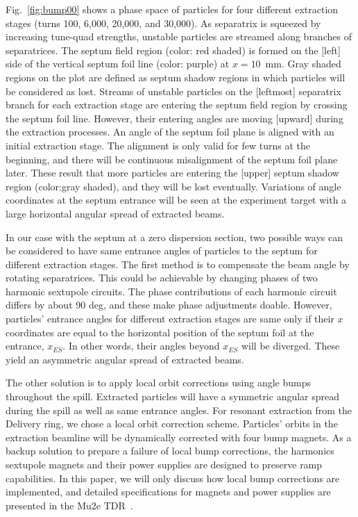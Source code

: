 \documentclass[aps,prstab,onecolumn,preprint,endfloats,11pt]{revtex4-1}
\begin{document}
Fig.~\ref{fig:bump00} shows a phase space of particles for four different extraction stages (turns 100, 6,000, 20,000, and 30,000). As separatrix is squeezed by increasing tune-quad strengths, unstable particles are streamed along branches of separatrices. The septum field region (color: red shaded) is formed on the [left] side of the vertical septum foil line (color: purple) at $x=10$~mm. Gray shaded regions on the plot are defined as septum shadow regions in which particles will be considered as lost. Streams of unstable particles on the [leftmost] separatrix branch for each extraction stage are entering the septum field region by crossing the septum foil line. However, their entering angles are moving [upward] during the extraction processes. An angle of the septum foil plane is aligned with an initial extraction stage. The alignment is only valid for few turns at the beginning, and there will be continuous misalignment of the septum foil plane later. These result that more particles are entering the [upper] septum shadow region (color:gray shaded), and they will be lost eventually.
Variations of angle coordinates at the septum entrance will be seen at the experiment target with a large horizontal angular spread of extracted beams.

In our case with the septum at a zero dispersion section, two possible ways can be considered to have same entrance angles of particles to the septum for different extraction stages. The first method is to compensate the beam angle by rotating separatrices. This could be achievable by changing phases of two harmonic sextupole circuits. The phase contributions of each harmonic circuit differs by about 90 deg, and these make phase adjustments doable. However, particles' entrance angles for different extraction stages are same only if their $x$ coordinates are equal to the horizontal position of the septum foil at the entrance, $x_{ES}$. In other words, their angles beyond $x_{ES}$ will be diverged. These yield an asymmetric angular spread of extracted beams.

The other solution is to apply local orbit corrections using angle bumps throughout the spill. Extracted particles will have a symmetric angular spread during the spill as well as same entrance angles. For resonant extraction from the Delivery ring, we chose a local orbit correction scheme. Particles' orbits in the extraction beamline will be dynamically corrected with four bump magnets. As a backup solution to prepare a failure of local bump corrections, the harmonics sextupole magnets and their power supplies are designed to preserve ramp capabilities. In this paper, we will only discuss how local bump corrections are implemented, and detailed specifications for magnets and power supplies are presented in the Mu2e TDR~\cite{tdr}.
\end{document}

